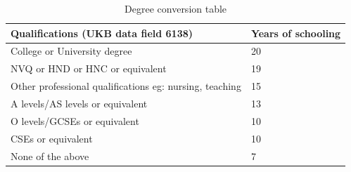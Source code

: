 \documentclass[hidelinks, 12pt]{article}
\begin{document}
\begin{table}[h!]
\caption{Degree conversion table}
\begin{center}
 \begin{tabular}{| l l |} 
 \hline
 \textbf{Qualifications (UKB data field 6138)} & \textbf{Years of schooling} \\ [0.5ex] 
 \hline\hline
  College or University degree  & 20  \\ 
  NVQ or HND or HNC or equivalent & 19  \\
  Other professional qualifications eg: nursing, teaching  & 15  \\
  A levels/AS levels or equivalent & 13  \\
  O levels/GCSEs or equivalent  & 10  \\
  CSEs or equivalent & 10  \\
  None of the above & 7  \\
   \hline
 \end{tabular}
\end{center}
\end{table}


%
%

\pagebreak



%
\end{document}
